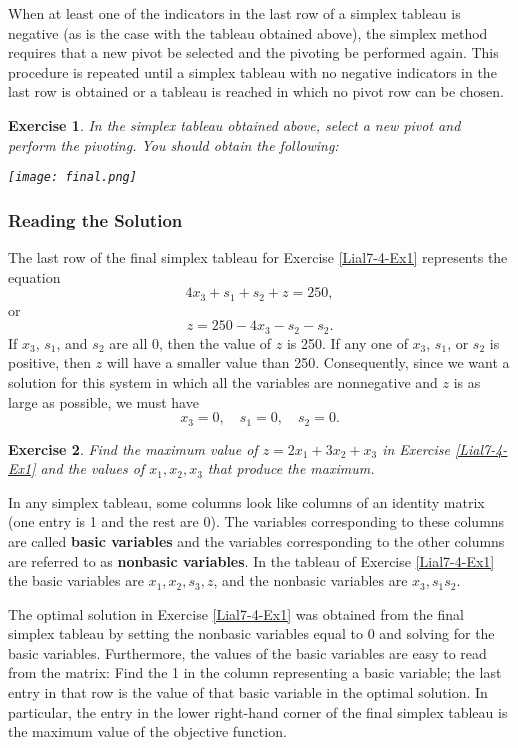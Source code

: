 \documentclass[letterpaper,10pt]{article}
\newtheorem{ex}{Exercise}
\begin{document}
When at least one of the indicators in the last row of a simplex tableau is negative (as is the case with the tableau obtained above), the simplex method requires that a new pivot be selected and the pivoting be performed again. This procedure is repeated until a simplex tableau with no negative indicators in the last row is obtained or a tableau is reached in which no pivot row can be chosen.

\begin{ex}
In the simplex tableau obtained above, select a new pivot and perform the pivoting.  You should obtain the following:
\begin{center}
\texttt{[image: final.png]}
\end{center}
\end{ex}

\subsubsection{Reading the Solution}

The last row of the final simplex tableau for Exercise \ref{Lial7-4-Ex1} represents the equation $$4x_3+s_1+s_2+z=250,$$ or $$z=250-4x_3-s_2-s_2.$$  
If $x_3$, $s_1$, and $s_2$ are all 0, then the value of $z$ is 250. If any one of $x_3$, $s_1$, or $s_2$ is positive, then $z$ will have a smaller value than 250. Consequently, since we want a solution for this system in which all the variables are nonnegative and $z$ is as large as possible, we must have
$$x_3 =0,\quad	s_1 =0,\quad	s_2 =0.$$

\begin{ex}
Find the maximum value of $z=2x_1+3x_2+x_3$ in Exercise \ref{Lial7-4-Ex1} and the values of $x_1,x_2,x_3$ that produce the maximum.
\end{ex}


In any simplex tableau, some columns look like columns of an identity matrix (one entry is 1 and the rest are 0). The variables corresponding to these columns are called {\bf basic variables} and the variables corresponding to the other columns are referred to as {\bf nonbasic variables}. In the tableau of  Exercise \ref{Lial7-4-Ex1} the basic variables are $x_1, x_2, s_3,z$, and the nonbasic variables are $x_3, s_1 s_2$.

The optimal solution in Exercise \ref{Lial7-4-Ex1} was obtained from the final simplex tableau by setting the nonbasic variables equal to 0 and solving for the basic variables. Furthermore, the values of the basic variables are easy to read from the matrix: Find the 1 in the column representing a basic variable; the last entry in that row is the value of that basic variable in the optimal solution. In particular, the entry in the lower right-hand corner of the final simplex tableau is the maximum value of the objective function.
\end{document}
